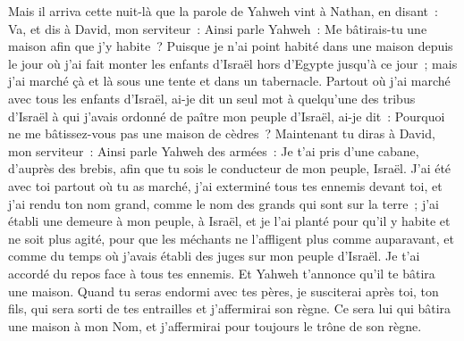 \begin{multicols}{2}
Mais il arriva cette nuit-là que la parole de Yahweh vint à Nathan, en disant~:
Va, et dis à David, mon serviteur~: Ainsi parle Yahweh~: Me bâtirais-tu une maison afin que j'y habite~?
Puisque je n'ai point habité dans une maison depuis le jour où j'ai fait monter les enfants d'Israël hors d'Egypte jusqu'à ce jour~; mais j'ai marché çà et là sous une tente et dans un tabernacle.
Partout où j'ai marché avec tous les enfants d'Israël, ai-je dit un seul mot à quelqu'une des tribus d'Israël à qui j'avais ordonné de paître mon peuple d'Israël, ai-je dit~: Pourquoi ne me bâtissez-vous pas une maison de cèdres~?
Maintenant tu diras à David, mon serviteur~: Ainsi parle Yahweh des armées~: Je t'ai pris d'une cabane, d'auprès des brebis, afin que tu sois le conducteur de mon peuple, Israël.
J'ai été avec toi partout où tu as marché, j'ai exterminé tous tes ennemis devant toi, et j'ai rendu ton nom grand, comme le nom des grands qui sont sur la terre~;
j'ai établi une demeure à mon peuple, à Israël, et je l'ai planté pour qu'il y habite et ne soit plus agité, pour que les méchants ne l'affligent plus comme auparavant,
et comme du temps où j'avais établi des juges sur mon peuple d'Israël. Je t'ai accordé du repos face à tous tes ennemis. Et Yahweh t'annonce qu'il te bâtira une maison.
Quand tu seras endormi avec tes pères, je susciterai après toi, ton fils, qui sera sorti de tes entrailles et j'affermirai son règne.
Ce sera lui qui bâtira une maison à mon Nom, et j'affermirai pour toujours le trône de son règne.

\end{multicols}
